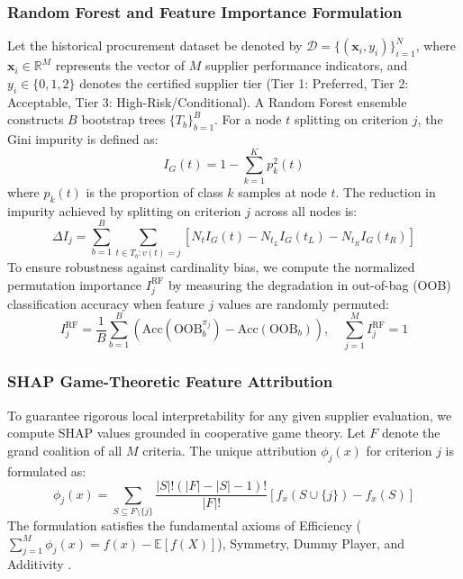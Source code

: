 \documentclass[twocolumn,10pt]{article}
\begin{document}
\subsubsection{Random Forest and Feature Importance Formulation}
Let the historical procurement dataset be denoted by $\mathcal{D} = \{(\mathbf{x}_i, y_i)\}_{i=1}^N$, where $\mathbf{x}_i \in \mathbb{R}^M$ represents the vector of $M$ supplier performance indicators, and $y_i \in \{0, 1, 2\}$ denotes the certified supplier tier (Tier 1: Preferred, Tier 2: Acceptable, Tier 3: High-Risk/Conditional). A Random Forest ensemble constructs $B$ bootstrap trees $\{T_b\}_{b=1}^B$. For a node $t$ splitting on criterion $j$, the Gini impurity is defined as:
\begin{equation}
    I_G(t) = 1 - \sum_{k=1}^K p_k^2(t)
    \label{eq:gini}
\end{equation}
where $p_k(t)$ is the proportion of class $k$ samples at node $t$. The reduction in impurity achieved by splitting on criterion $j$ across all nodes is:
\begin{equation}
    \Delta I_j = \sum_{b=1}^B \sum_{t \in T_b : v(t)=j} \left[ N_t I_G(t) - N_{t_L} I_G(t_L) - N_{t_R} I_G(t_R) \right]
    \label{eq:gini_split}
\end{equation}
To ensure robustness against cardinality bias, we compute the normalized permutation importance $I_j^{\text{RF}}$ by measuring the degradation in out-of-bag (OOB) classification accuracy when feature $j$ values are randomly permuted:
\begin{equation}
    I_j^{\text{RF}} = \frac{1}{B} \sum_{b=1}^B \left( \text{Acc}(\text{OOB}_b^{\pi_j}) - \text{Acc}(\text{OOB}_b) \right), \quad \sum_{j=1}^M I_j^{\text{RF}} = 1
    \label{eq:perm_imp}
\end{equation}

\subsubsection{SHAP Game-Theoretic Feature Attribution}
To guarantee rigorous local interpretability for any given supplier evaluation, we compute SHAP values grounded in cooperative game theory. Let $F$ denote the grand coalition of all $M$ criteria. The unique attribution $\phi_j(x)$ for criterion $j$ is formulated as:
\begin{equation}
    \phi_j(x) = \sum_{S \subseteq F \setminus \{j\}} \frac{|S|!(|F| - |S| - 1)!}{|F|!} \left[ f_x(S \cup \{j\}) - f_x(S) \right]
    \label{eq:shap}
\end{equation}
The formulation satisfies the fundamental axioms of Efficiency ($\sum_{j=1}^M \phi_j(x) = f(x) - \mathbb{E}[f(X)]$), Symmetry, Dummy Player, and Additivity \cite{lundberg2017unified}.
\end{document}

